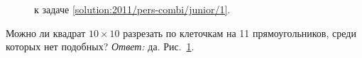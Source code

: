 \ifsolution
\begin{figure}\centering
    \caption{к задаче \ref{solution:2011/pers-combi/junior/1}.}
    \label{fig:solution:2011/pers-combi/junior/1}
\end{figure}
\fi %

\problem
Можно ли квадрат $10 \times 10$ разрезать по клеточкам на 11 прямоугольников,
среди которых нет подобных?
\solution
\label{solution:2011/pers-combi/junior/1}%
\emph{Ответ:} да.
Рис.~\ref{fig:solution:2011/pers-combi/junior/1}.
\endproblem
